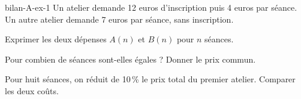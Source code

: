 \begin{blocEdition}{bilan-A-ex-1}
Un atelier demande 12 euros d’inscription puis 4 euros par séance. Un autre atelier demande 7 euros par séance, sans inscription.\begin{questions}
\item Exprimer les deux dépenses $A(n)$ et $B(n)$ pour $n$ séances.
\item Pour combien de séances sont-elles égales ? Donner le prix commun.
\item Pour huit séances, on réduit de 10\,\% le prix total du premier atelier. Comparer les deux coûts.
\end{questions}\par{}\par\par{}\par{}\par{}\par{}\par{}\par{}
\end{blocEdition}
